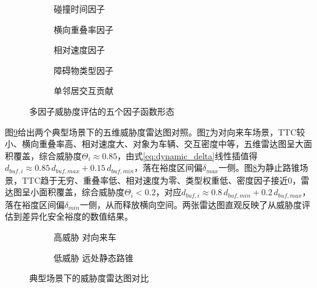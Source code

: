 \begin{figure}[htbp]
\centering
\begin{subfigure}[b]{0.32\textwidth}
  \centering
  
  \caption{碰撞时间因子}
  \label{fig:threat_factors:a}
\end{subfigure}\hfill
\begin{subfigure}[b]{0.32\textwidth}
  \centering
  
  \caption{横向重叠率因子}
  \label{fig:threat_factors:b}
\end{subfigure}\hfill
\begin{subfigure}[b]{0.32\textwidth}
  \centering
  
  \caption{相对速度因子}
  \label{fig:threat_factors:c}
\end{subfigure}

\vspace{0.8em}

\begin{subfigure}[b]{0.32\textwidth}
  \centering
  
  \caption{障碍物类型因子}
  \label{fig:threat_factors:d}
\end{subfigure}\hspace{0.02\textwidth}
\begin{subfigure}[b]{0.32\textwidth}
  \centering
  
  \caption{单邻居交互贡献}
  \label{fig:threat_factors:e}
\end{subfigure}
\caption{多因子威胁度评估的五个因子函数形态}
\label{fig:threat_factors}
\end{figure}

图\ref{fig:threat_radar}给出两个典型场景下的五维威胁度雷达图对照。图\ref{fig:threat_radar:a}为对向来车场景，TTC较小、横向重叠率高、相对速度大、对象为车辆、交互密度中等，五维雷达图呈大面积覆盖，综合威胁度$\Theta_i\approx 0.85$，由式\eqref{eq:dynamic_delta}线性插值得$d_{buf,i}\approx 0.85\,d_{buf,max}+0.15\,d_{buf,min}$，落在裕度区间偏$\delta_{max}$一侧。图\ref{fig:threat_radar:b}为静止路锥场景，TTC趋于无穷、重叠率低、相对速度为零、类型权重低、密度因子接近0，雷达图呈小面积覆盖，综合威胁度$\Theta_i<0.2$，对应$d_{buf,i}\approx 0.8\,d_{buf,min}+0.2\,d_{buf,max}$，落在裕度区间偏$\delta_{min}$一侧，从而释放横向空间。两张雷达图直观反映了从威胁度评估到差异化安全裕度的数值结果。

\begin{figure}[htbp]
\centering
\begin{subfigure}[b]{0.48\textwidth}
  \centering
  \caption{高威胁 \;\; 对向来车}
  \label{fig:threat_radar:a}
\end{subfigure}\hfill
\begin{subfigure}[b]{0.48\textwidth}
  \centering
  \caption{低威胁 \;\; 远处静态路锥}
  \label{fig:threat_radar:b}
\end{subfigure}
\caption{典型场景下的威胁度雷达图对比}
\label{fig:threat_radar}
\end{figure}

